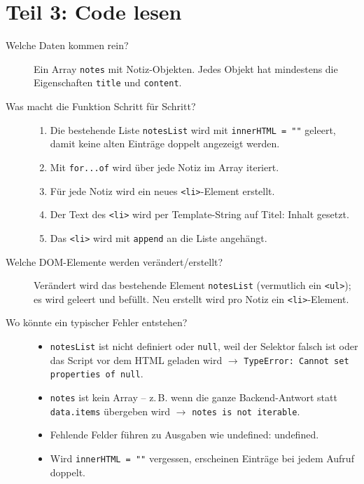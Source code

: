 \documentclass[a4paper,12pt]{article}
\begin{document}
\section{Teil 3: Code lesen}

\begin{description}
    \item[Welche Daten kommen rein?] Ein Array \texttt{notes} mit Notiz-Objekten. Jedes Objekt hat mindestens die Eigenschaften \texttt{title} und \texttt{content}.
    \item[Was macht die Funktion Schritt für Schritt?] \hfill
    \begin{enumerate}
        \item Die bestehende Liste \texttt{notesList} wird mit \texttt{innerHTML = ""} geleert, damit keine alten Einträge doppelt angezeigt werden.
        \item Mit \texttt{for...of} wird über jede Notiz im Array iteriert.
        \item Für jede Notiz wird ein neues \texttt{<li>}-Element erstellt.
        \item Der Text des \texttt{<li>} wird per Template-String auf \glqq Titel: Inhalt\grqq{} gesetzt.
        \item Das \texttt{<li>} wird mit \texttt{append} an die Liste angehängt.
    \end{enumerate}
    \item[Welche DOM-Elemente werden verändert/erstellt?] Verändert wird das bestehende Element \texttt{notesList} (vermutlich ein \texttt{<ul>}); es wird geleert und befüllt. Neu erstellt wird pro Notiz ein \texttt{<li>}-Element.
    \item[Wo könnte ein typischer Fehler entstehen?] \hfill
    \begin{itemize}
        \item \texttt{notesList} ist nicht definiert oder \texttt{null}, weil der Selektor falsch ist oder das Script vor dem HTML geladen wird $\rightarrow$ \texttt{TypeError: Cannot set properties of null}.
        \item \texttt{notes} ist kein Array -- z.\,B. wenn die ganze Backend-Antwort statt \texttt{data.items} übergeben wird $\rightarrow$ \texttt{notes is not iterable}.
        \item Fehlende Felder führen zu Ausgaben wie \glqq undefined: undefined\grqq.
        \item Wird \texttt{innerHTML = ""} vergessen, erscheinen Einträge bei jedem Aufruf doppelt.
    \end{itemize}
\end{description}
\end{document}
